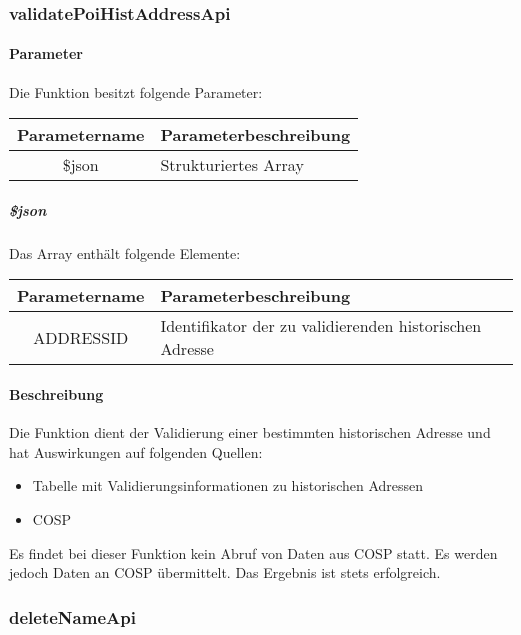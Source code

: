 \subsubsection{validatePoiHistAddressApi}
\paragraph{Parameter} Die Funktion besitzt folgende Parameter:
\begin{table}[H]
	\begin{tabular}{|c|p{11cm}|}
		\hline
		\textbf{Parametername} & \textbf{Parameterbeschreibung} \\ \hline
		\$json & Strukturiertes Array \\ \hline
	\end{tabular}
\end{table}
\subparagraph{\$json}Das Array enthält folgende Elemente:
\begin{table}[H]
	\begin{tabular}{|c|p{11cm}|}
		\hline
		\textbf{Parametername} & \textbf{Parameterbeschreibung} \\ \hline
		ADDRESSID & Identifikator der zu validierenden historischen Adresse \\ \hline
	\end{tabular}
\end{table}
\paragraph{Beschreibung} Die Funktion dient der Validierung einer bestimmten historischen Adresse und hat Auswirkungen auf folgenden Quellen:
\begin{itemize}
	\item Tabelle mit Validierungsinformationen zu historischen Adressen
	\item COSP
\end{itemize}
Es findet bei dieser Funktion kein Abruf von Daten aus {\glqq COSP\grqq} statt. Es werden jedoch Daten an {\glqq COSP\grqq} übermittelt. Das Ergebnis ist stets erfolgreich.
\subsubsection{deleteNameApi}
